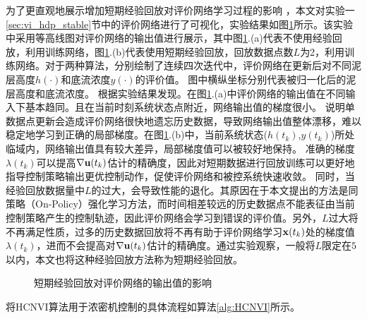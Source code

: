为了更直观地展示增加短期经验回放对评价网络学习过程的影响
，本文对实验一\ref{sec:vi_hdp_stable}节中的评价网络进行了可视化，实验结果如图\ref{fig:replay_compare}所示。该实验中采用等高线图对评价网络的输出值进行展示，其中图\ref{fig:replay_compare}.(a)代表不使用经验回放，利用训练网络，图\ref{fig:replay_compare}.(b)代表使用短期经验回放，回放数据点数$L$为2，利用训练网络。对于两种算法，分别绘制了连续四次迭代中，评价网络在更新后对不同泥层高度$h(\cdot)$和底流浓度$y(\cdot)$的评价值。
图中横纵坐标分别代表被归一化后的泥层高度和底流浓度。
根据实验结果发现。在图\ref{fig:replay_compare}.(a)中评价网络的输出值在不同输入下基本趋同。且在当前时刻系统状态点附近，网络输出值的梯度很小。
说明单数据点更新会造成评价网络很快地遗忘历史数据，导致网络输出值整体漂移，难以稳定地学习到正确的局部梯度。在图\ref{fig:replay_compare}.(b)中，当前系统状态($h(t_k)$,$y(t_k)$)所处临域内，网络输出值具有较大差异，局部梯度值可以被较好地保持。
准确的梯度$\lambda(t_k)$可以提高$\nabla \mathbf
u(t_k)$估计的精确度，因此对短期数据进行回放训练可以更好地指导控制策略输出更优控制动作，促使评价网络和被控系统快速收敛。
同时，当经验回放数据量中$L$的过大，会导致性能的退化。其原因在于本文提出的方法是同策略（On-Policy）强化学习方法，而时间相差较远的历史数据点不能表征由当前控制策略产生的控制轨迹，因此评价网络会学习到错误的评价值。另外，$L$过大将不再满足性质，过多的历史数据回放将不再有助于评价网络学习$\mathbf
x(t_k)$处的梯度值$\lambda(t_k)$，进而不会提高对$\nabla \mathbf
u(t_k)$估计的精确度。通过实验观察，一般将$L$限定在$5$以内，本文也将这种经验回放方法称为短期经验回放。

\begin{figure}[!ht]
\centering 
{}
\caption{短期经验回放对评价网络的输出值的影响 }
\label{fig:replay_compare}
\end{figure}

将HCNVI算法用于浓密机控制的具体流程如算法\ref{alg:HCNVI}所示。

